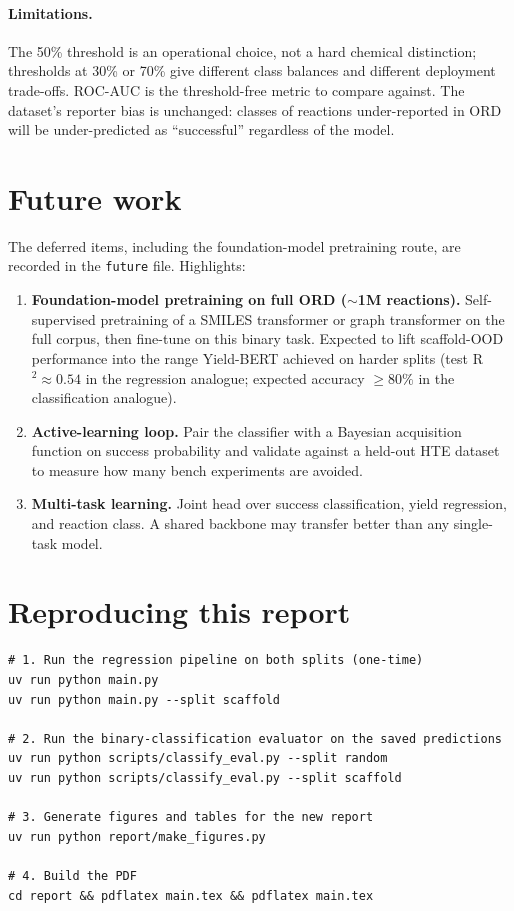 \documentclass[11pt,a4paper]{article}
\begin{document}
\paragraph{Limitations.}
The 50\% threshold is an operational choice, not a hard chemical
distinction; thresholds at 30\% or 70\% give different class balances and
different deployment trade-offs. ROC-AUC is the threshold-free metric
to compare against. The dataset's reporter bias is unchanged: classes of
reactions under-reported in ORD will be under-predicted as ``successful''
regardless of the model.

\section{Future work}

The deferred items, including the foundation-model pretraining route, are
recorded in the \texttt{future} file. Highlights:

\begin{enumerate}
  \item \textbf{Foundation-model pretraining on full ORD ($\sim$1M
        reactions).} Self-supervised pretraining of a SMILES transformer or
        graph transformer on the full corpus, then fine-tune on this binary
        task. Expected to lift scaffold-OOD performance into the
        range Yield-BERT achieved on harder splits (test R$^2 \approx 0.54$
        in the regression analogue; expected accuracy $\geq 80\%$ in the
        classification analogue).
  \item \textbf{Active-learning loop.} Pair the classifier with a Bayesian
        acquisition function on success probability and validate against a
        held-out HTE dataset to measure how many bench experiments are
        avoided.
  \item \textbf{Multi-task learning.} Joint head over success classification,
        yield regression, and reaction class. A shared backbone may
        transfer better than any single-task model.
\end{enumerate}

\section{Reproducing this report}

\begin{verbatim}
# 1. Run the regression pipeline on both splits (one-time)
uv run python main.py
uv run python main.py --split scaffold

# 2. Run the binary-classification evaluator on the saved predictions
uv run python scripts/classify_eval.py --split random
uv run python scripts/classify_eval.py --split scaffold

# 3. Generate figures and tables for the new report
uv run python report/make_figures.py

# 4. Build the PDF
cd report && pdflatex main.tex && pdflatex main.tex
\end{verbatim}
\end{document}

